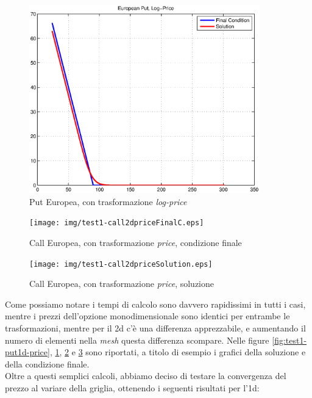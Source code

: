 \documentclass[a4paper,10pt]{report}
\theoremstyle{plain}
\theoremstyle{definition}
\theoremstyle{remark}
\begin{document}
\begin{figure}[h!]
\begin{center}
\includegraphics[width=10cm]{img/test1-put1dlogprice.eps}
\caption{Put Europea, con trasformazione \emph{log-price}}
\label{fig:test1-put1d-logprice}
\end{center}
\end{figure}
\begin{figure}[htp!]
\begin{center}
\texttt{[image: img/test1-call2dpriceFinalC.eps]}
\caption{Call Europea, con trasformazione \emph{price}, condizione finale}
\label{fig:test1-call1d-fc}
\end{center}
\end{figure}
\begin{figure}[htp!]
\begin{center}
\texttt{[image: img/test1-call2dpriceSolution.eps]}
\caption{Call Europea, con trasformazione \emph{price}, soluzione}
\label{fig:test1-call1d-sol}
\end{center}
\end{figure}
Come possiamo notare i tempi di calcolo sono davvero rapidissimi in tutti i casi, mentre i prezzi dell'opzione monodimensionale sono identici per entrambe le trasformazioni, mentre per il 2d c'\`e una differenza apprezzabile, e aumentando il numero di elementi nella \emph{mesh} questa differenza scompare.
Nelle figure \ref{fig:test1-put1d-price}, \ref{fig:test1-put1d-logprice}, \ref{fig:test1-call1d-fc} e \ref{fig:test1-call1d-sol} sono riportati, a titolo di esempio i grafici della soluzione e della condizione finale.\\Oltre a questi semplici calcoli, abbiamo deciso di testare la convergenza del prezzo al variare della griglia, ottenendo i seguenti risultati per l'1d:
\end{document}
